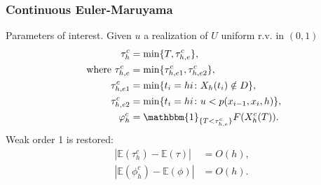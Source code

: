 \begin{frame}
\frametitle{Continuous Euler-Maruyama}
Parameters of interest. Given $u$ a realization of $U$ uniform r.v. in $(0,1)$
\begin{equation*}
\begin{aligned}
	\tau_h^c &= \min \{T,\tau_{h,e}^c\}, \\
	\text{ where } \tau_{h,e}^c &= \min\{\tau_{h,e1}^c, \tau_{h,e2}^c\}, \\
	\tau_{h,e1}^c &= \min\{t_i = hi \colon X_h(t_i) \notin D\}, \\
	\tau_{h,e2}^c &= \min\{t_i = hi \colon u < p(x_{i-1},x_i,h) \}, \\
	\phi_h^c &= \mathbbm{1}_{\{T < \tau_{h,e}^c\}}F(X_h^c(T)).
\end{aligned}
\end{equation*}
Weak order 1 is restored:
\begin{align*}
	|\mathbb{E}(\tau_h^c) - \mathbb{E}(\tau)| &= O(h), \\
	|\mathbb{E}(\phi_h^c) - \mathbb{E}(\phi)| &= O(h).
\end{align*}
\end{frame}
